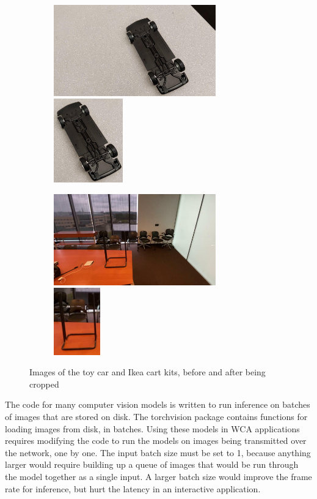 \begin{figure}
  \begin{subfigure}{\textwidth}
    \includegraphics[width=7cm]{figures/two_stage/car_original.jpg}
    \includegraphics[width=3cm]{figures/two_stage/car_crop.jpg}
  \end{subfigure}
  \begin{subfigure}{\textwidth}
    \includegraphics[width=7cm]{figures/two_stage/cart_original.jpg}
    \includegraphics[width=2cm]{figures/two_stage/cart_crop.jpg}
  \end{subfigure}
  \caption{
    Images of the toy car and Ikea cart kits, before and after being cropped
  }\label{fig:crop_examples}
\end{figure}

The code for many computer vision models is written to run inference on batches
of images that are stored on disk. The torchvision package contains functions
for loading images from disk, in batches. Using these models in WCA applications
requires modifying the code to run the models on images being transmitted over
the network, one by one. The input batch size must be set to 1, because anything
larger would require building up a queue of images that would be run through the
model together as a single input.
A larger batch size would improve the frame rate for inference, but hurt the
latency in an interactive application.

